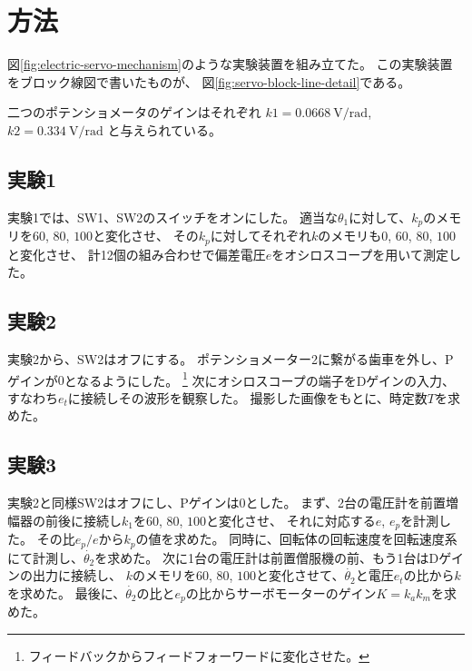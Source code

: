 \documentclass[../../../main]{subfiles}
\begin{document}
\section{方法}

図\ref{fig:electric-servo-mechanism}のような実験装置を組み立てた。
この実験装置をブロック線図で書いたものが、
図\ref{fig:servo-block-line-detail}である。

二つのポテンショメータのゲインはそれぞれ
$k1 = \SI{0.0668}{\volt\per\radian}$, $k2 = \SI{0.334}{\volt\per\radian}$
と与えられている。

\subsection{実験1}
実験1では、SW1、SW2のスイッチをオンにした。
適当な$\theta_1$に対して、$k_p$のメモリを$60$, $80$, $100$と変化させ、
その$k_p$に対してそれぞれ$k$のメモリも$0$, $60$, $80$, $100$と変化させ、
計12個の組み合わせで偏差電圧$e$をオシロスコープを用いて測定した。

\subsection{実験2}
実験2から、SW2はオフにする。
ポテンショメーター2に繋がる歯車を外し、Pゲインが$0$となるようにした。
\footnote{
	フィードバックからフィードフォーワードに変化させた。
}
次にオシロスコープの端子をDゲインの入力、すなわち$e_t$に接続しその波形を観察した。
撮影した画像をもとに、時定数$T$を求めた。

\subsection{実験3}
実験2と同様SW2はオフにし、Pゲインは$0$とした。
まず、2台の電圧計を前置増幅器の前後に接続し$k_1$を$60$, $80$, $100$と変化させ、
それに対応する$e$, $e_p$を計測した。
その比$e_p/e$から$k_p$の値を求めた。
同時に、回転体の回転速度を回転速度系にて計測し、$\dot{\theta_2}$を求めた。
次に1台の電圧計は前置僧服機の前、もう1台はDゲインの出力に接続し、
$k$のメモリを$60$, $80$, $100$と変化させて、$\dot{\theta_2}$と電圧$e_t$の比から$k$を求めた。
最後に、$\dot{\theta_2}$の比と$e_p$の比からサーボモーターのゲイン$K=k_ak_m$を求めた。
\end{document}
